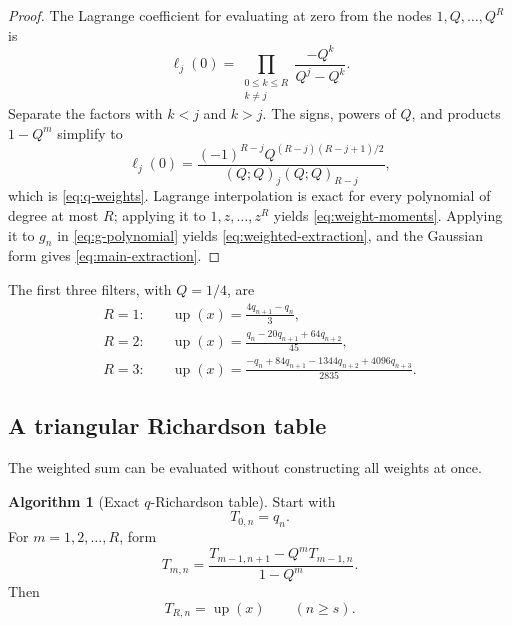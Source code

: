 \documentclass[11pt]{article}
\theoremstyle{definition}
\newtheorem{algorithm}[algorithm]{Algorithm}
\theoremstyle{remark}
\newcommand{\rv}{\operatorname{up}}
\begin{document}
\begin{proof}
The Lagrange coefficient for evaluating at zero from the nodes
\(1,Q,\ldots,Q^R\) is
\begin{equation}
 \ell_j(0)=\prod_{\substack{0\le k\le R\\k\ne j}}
 \frac{-Q^k}{Q^j-Q^k}.
 \label{eq:Lagrange-weight-product}
\end{equation}
Separate the factors with \(k<j\) and \(k>j\).  The signs, powers of \(Q\),
and products \(1-Q^m\) simplify to
\[
 \ell_j(0)=
 \frac{(-1)^{R-j}Q^{(R-j)(R-j+1)/2}}
 {(Q;Q)_j(Q;Q)_{R-j}},
\]
which is \cref{eq:q-weights}.  Lagrange interpolation is exact for every
polynomial of degree at most \(R\); applying it to \(1,z,\ldots,z^R\) yields
\cref{eq:weight-moments}.  Applying it to \(g_n\) in
\cref{eq:g-polynomial} yields \cref{eq:weighted-extraction}, and the Gaussian
form gives \cref{eq:main-extraction}.
\end{proof}

The first three filters, with \(Q=1/4\), are
\begin{align}
 R=1:\quad &\rv(x)=\frac{4q_{n+1}-q_n}{3},
 \label{eq:filter1}\\
 R=2:\quad &\rv(x)=\frac{q_n-20q_{n+1}+64q_{n+2}}{45},
 \label{eq:filter2}\\
 R=3:\quad &\rv(x)=
 \frac{-q_n+84q_{n+1}-1344q_{n+2}+4096q_{n+3}}{2835}.
 \label{eq:filter3}
\end{align}

\subsection{A triangular Richardson table}

The weighted sum can be evaluated without constructing all weights at once.

\begin{algorithm}[Exact \(q\)-Richardson table]
\label{alg:richardson}
Start with
\begin{equation}
 T_{0,n}=q_n.
 \label{eq:T0}
\end{equation}
For \(m=1,2,\ldots,R\), form
\begin{equation}
 \boxed{
 T_{m,n}=\frac{T_{m-1,n+1}-Q^mT_{m-1,n}}{1-Q^m}.}
 \label{eq:richardson-recursion}
\end{equation}
Then
\begin{equation}
 T_{R,n}=\rv(x)\qquad(n\ge s).
 \label{eq:richardson-exact}
\end{equation}
\end{algorithm}
\end{document}
